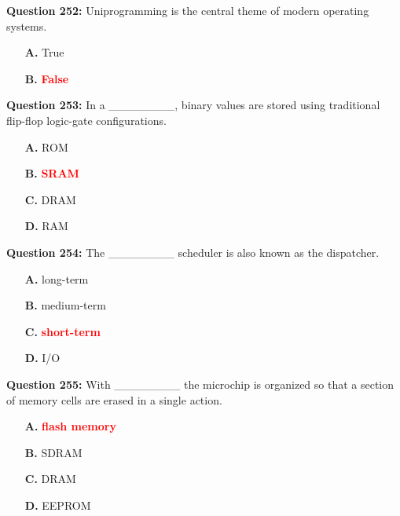 \documentclass[12pt,a4paper]{article}
\begin{document}
\vspace{0.5cm}

\textbf{Question 252:} Uniprogramming is the central theme of modern operating systems.

\begin{itemize}
    \item[\textbf{A.}] True
    \item[\textbf{B.}] \textcolor{red}{\textbf{False}}
\end{itemize}

\vspace{0.5cm}

\textbf{Question 253:} In a ________, binary values are stored using traditional flip-flop logic-gate configurations.

\begin{itemize}
    \item[\textbf{A.}] ROM
    \item[\textbf{B.}] \textcolor{red}{\textbf{SRAM}}
    \item[\textbf{C.}] DRAM
    \item[\textbf{D.}] RAM
\end{itemize}

\vspace{0.5cm}

\textbf{Question 254:} The ________ scheduler is also known as the dispatcher.

\begin{itemize}
    \item[\textbf{A.}] long-term
    \item[\textbf{B.}] medium-term
    \item[\textbf{C.}] \textcolor{red}{\textbf{short-term}}
    \item[\textbf{D.}] I/O
\end{itemize}

\vspace{0.5cm}

\textbf{Question 255:} With ________ the microchip is organized so that a section of memory cells are erased in a single action.

\begin{itemize}
    \item[\textbf{A.}] \textcolor{red}{\textbf{flash memory}}
    \item[\textbf{B.}] SDRAM
    \item[\textbf{C.}] DRAM
    \item[\textbf{D.}] EEPROM
\end{itemize}
\end{document}
